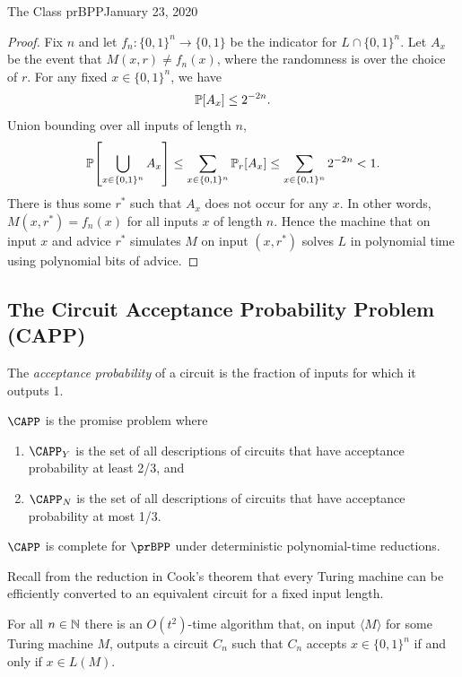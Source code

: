 \begin{lecture}{1}{The Class prBPP}{January 23, 2020}
\begin{proof}
    Fix $n$ and let $f_n : \{0, 1\}^n \to \{0, 1\}$ be the indicator for $L
    \cap \{0, 1\}^n$. Let $A_x$ be the event that $M(x, r) \ne f_n(x)$, where
    the randomness is over the choice of $r$. For any fixed $x \in \{0, 1\}^n$,
    we have
    \begin{align*}
      \Pr\brac*{A_x} \leq 2^{-2n}.
    \end{align*}
    Union bounding over all inputs of length $n$, \[
      \Pr\brac*{\bigcup_{x \in \set{0, 1}^n} A_x}
      \leq \sum_{x \in \set{0,1}^n} \Pr_r\brac*{A_x}
      \leq \sum_{x \in \set{0,1}^n} 2^{-2n}
      < 1.
    \]
    There is thus some $r^*$ such that $A_x$ does not occur for any $x$. In
    other words, $M(x,r^*) = f_n(x)$ for all inputs $x$ of length $n$. Hence the
    machine that on input $x$ and advice $r^*$ simulates $M$ on input $(x,
    r^*)$ solves $L$ in polynomial time using polynomial bits of advice.
\end{proof}


\subsection{The Circuit Acceptance Probability Problem (CAPP)}

The \emph{acceptance probability} of a circuit is the fraction of inputs for
which it outputs 1.

\begin{definition}[$\CAPP$]
  $\CAPP$ is the promise problem where
  \begin{enumerate}
    \item $\CAPP_Y$ is the set of all descriptions of circuits that have
      acceptance probability at least 2/3, and
    \item $\CAPP_N$ is the set of all descriptions of circuits that have
      acceptance probability at most 1/3.
  \end{enumerate}
\end{definition}

\begin{theorem}\label{thm:complete}
  $\CAPP$ is complete for $\prBPP$ under deterministic polynomial-time reductions.
\end{theorem}

Recall from the reduction in Cook's theorem that every Turing machine can be
efficiently converted to an equivalent circuit for a fixed input length.
\begin{lemma}\label{lem:tm-to-circuit}
  For all $n \in \mathbb{N}$ there is an $O(t^2)$-time algorithm that, on input
  $\langle M \rangle$ for some Turing machine $M$, outputs a circuit $C_n$ such
  that $C_n$ accepts $x \in \{0, 1\}^n$ if and only if $x \in L(M)$.
\end{lemma}


\end{lecture}
